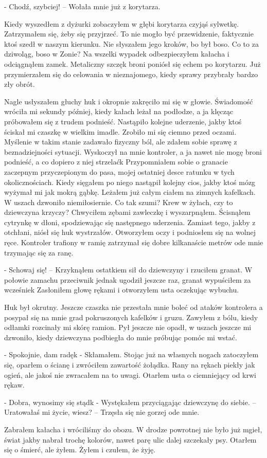 \documentclass[../MAIN.tex]{subfiles}
\begin{document}
- Chodź, szybciej! – Wołała mnie już z korytarza.

Kiedy wyszedłem z dyżurki zobaczyłem w głębi korytarza czyjąś sylwetkę. Zatrzymałem się, żeby się przyjrzeć. To nie mogło być przewidzenie, faktycznie ktoś szedł w naszym kierunku. Nie słyszałem jego kroków, bo był boso. Co to za dziwoląg, boso w Zonie? Na wszelki wypadek odbezpieczyłem kałacha i odciągnąłem zamek. Metaliczny szczęk broni poniósł się echem po korytarzu. Już przymierzałem się do celowania w nieznajomego, kiedy sprawy przybrały bardzo zły obrót.

Nagle usłyszałem głuchy huk i okropnie zakręciło mi się w głowie. Świadomość wróciła mi sekundy później, kiedy kałach leżał na podłodze, a ja klęcząc próbowałem się z trudem podnieść. Nastąpiło kolejne uderzenie, jakby ktoś ściskał mi czaszkę w wielkim imadle. Zrobiło mi się ciemno przed oczami. Myślenie w takim stanie zadawało fizyczny ból, ale zdałem sobie sprawę z beznadziejności sytuacji. Wyskoczył na mnie kontroler, a ja nawet nie mogę broni podnieść, a co dopiero z niej strzelać\3k Przypomniałem sobie o granacie zaczepnym przyczepionym do pasa, mojej ostatniej desce ratunku w tych okolicznościach. Kiedy sięgałem po niego nastąpił kolejny cios, jakby ktoś mózg wyżymał mi jak mokrą gąbkę. Leżałem już całym ciałem na zimnych kafelkach. W uszach dzwoniło niemiłosiernie. Co tak szumi? Krew w żyłach, czy to dziewczyna krzyczy? Chwyciłem zębami zawleczkę i wyszarpnąłem. Ścisnąłem cytrynkę w dłoni, spodziewając się następnego uderzenia. Zamiast tego, jakby z otchłani, niósł się huk wystrzałów. Otworzyłem oczy i 
podniosłem się na wolnej ręce. Kontroler trafiony w ramię zatrzymał się dobre kilkanaście metrów ode mnie trzymając się za ranę.

- Schowaj się! – Krzyknąłem ostatkiem sił do dziewczyny i rzuciłem granat. W połowie zamachu przeciwnik jednak ugodził jeszcze raz, granat wypuściłem za wcześnie\3k Zasłoniłem głowę rękami i otworzyłem usta oczekując wybuchu.

Huk był okrutny. Jeszcze czaszka nie przestała mnie boleć od ataków kontrolera a posypał się na mnie grad pokruszonych kafelków i gruzu. Zawyłem z bólu, kiedy odłamki rozcinały mi skórę ramion. Pył jeszcze nie opadł, w uszach jeszcze mi dzwoniło, kiedy dziewczyna podbiegła do mnie próbując pomóc mi wstać.

- Spokojnie, dam radę\3k - Skłamałem. Stojąc już na własnych nogach zatoczyłem się, oparłem o ścianę i zwróciłem zawartość żołądka. Rany na rękach piekły jak ogień, ale jakoś nie zwracałem na to uwagi. Otarłem usta o ciemniejący od krwi rękaw.

- Dobra, wynosimy się stąd\3k - Wystękałem przyciągając dziewczynę do siebie. – Uratowałaś mi życie, wiesz? – Trzęsła się nie gorzej ode mnie.

Zabrałem kałacha i wróciliśmy do obozu. W drodze powrotnej nie było już mgieł, świat jakby nabrał trochę kolorów, nawet parę ulic dalej szczekały psy. Otarłem się o śmierć, ale żyłem. Żyłem i czułem, że żyję.
\end{document}
